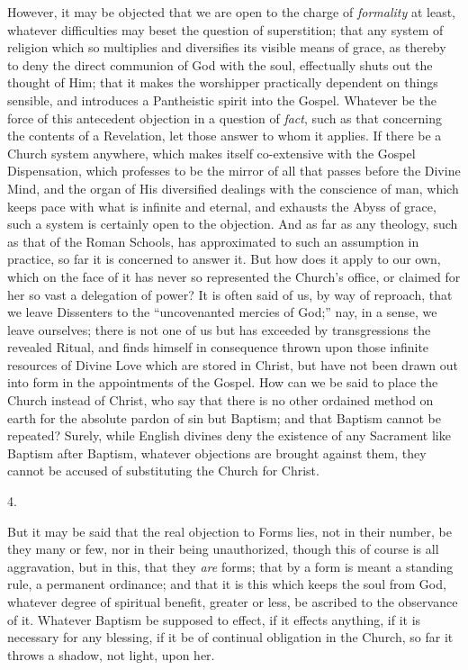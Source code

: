 However, it may be objected that we are open to the charge of \emph{formality}
at least, whatever difficulties may beset the question of
superstition; that any system of religion which so multiplies and
diversifies its visible means of grace, as thereby to deny the direct
communion of God with the soul, effectually shuts out the thought of
Him; that it makes the worshipper practically dependent on things
sensible, and introduces a Pantheistic spirit into the Gospel.
Whatever be the force of this antecedent objection in a question of \emph{fact},
such as that concerning the contents of a Revelation, let those answer
to whom it applies. If there be a Church system anywhere, which makes
itself co-extensive with the Gospel Dispensation, which professes to
be the mirror of all that passes before the Divine Mind, and the organ
of His diversified dealings with the conscience of man, which keeps
pace with what is infinite and eternal, and exhausts the Abyss of
grace, such a system is certainly open to the objection. And as far as
any theology, such as that of the Roman Schools, has approximated to
such an assumption in practice, so far it is concerned to answer
it. But how does it apply to our own, which on the face of it has
never so represented the Church's office, or claimed for her so vast a
delegation of power? It is often said of us, by way of reproach, that
we leave Dissenters to the ``uncovenanted mercies of God;''
nay, in a sense, we leave ourselves; there is not one of us but has
exceeded by transgressions the revealed Ritual, and finds himself in
consequence thrown upon those infinite resources of Divine Love which
are stored in Christ, but have not been drawn out into form in the
appointments of the Gospel. How can we be said to place the Church
instead of Christ, who say that there is no other ordained method on
earth for the absolute pardon of sin but Baptism; and that Baptism
cannot be repeated? Surely, while English divines deny the existence
of any Sacrament like Baptism after Baptism, whatever objections are
brought against them, they cannot be accused of substituting the
Church for Christ.

4.

But it may be said that the real objection to Forms lies, not in
their number, be they many or few, nor in their being unauthorized,
though this of course is all aggravation, but in this, that they \emph{are}
forms; that by a form is meant a standing rule, a permanent ordinance;
and that it is this which keeps the soul from God, whatever degree of
spiritual benefit, greater or less, be ascribed to the observance of
it. Whatever Baptism be supposed to effect, if it effects anything, if
it is necessary for any blessing, if it be of continual obligation in
the Church, so far it throws a shadow, not light, upon her.

